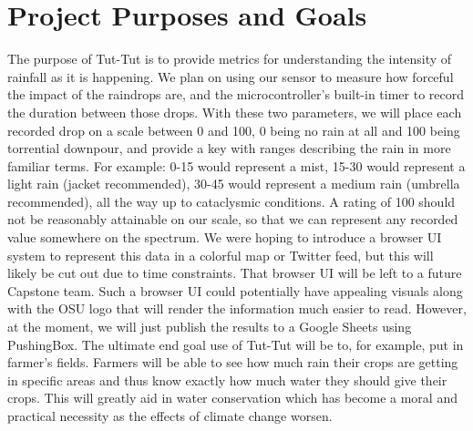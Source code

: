 \documentclass[letterpaper,10pt,draftclsnofoot,onecolumn]{article}
\begin{document}
\section{Project Purposes and Goals}
The purpose of Tut-Tut is to provide metrics for understanding the intensity of rainfall as it is happening. We plan on using our sensor to measure how forceful the impact of the raindrops are, and the microcontroller's built-in timer to record the duration between those drops.
\newline
With these two parameters, we will place each recorded drop on a scale between 0 and 100, 0 being no rain at all and 100 being torrential downpour, and provide a key with ranges describing the rain in more familiar terms. For example: 0-15 would represent a mist, 15-30 would represent a light rain (jacket recommended), 30-45 would represent a medium rain (umbrella recommended), all the way up to cataclysmic conditions. A rating of 100 should not be reasonably attainable on our scale, so that we can represent any recorded value somewhere on the spectrum. 
\newline
We were hoping to introduce a browser UI system to represent this data in a colorful map or Twitter feed, but this will likely be cut out due to time constraints. That browser UI will be left to a future Capstone team. Such a browser UI could potentially have appealing visuals along with the OSU logo that will render the information much easier to read. However, at the moment, we will just publish the results to a Google Sheets using PushingBox.
\newline
The ultimate end goal use of Tut-Tut will be to, for example, put in farmer's fields. Farmers will be able to see how much rain their crops are getting in specific areas and thus know exactly how much water they should give their crops. This will greatly aid in water conservation which has become a moral and practical necessity as the effects of climate change worsen.
\end{document}
